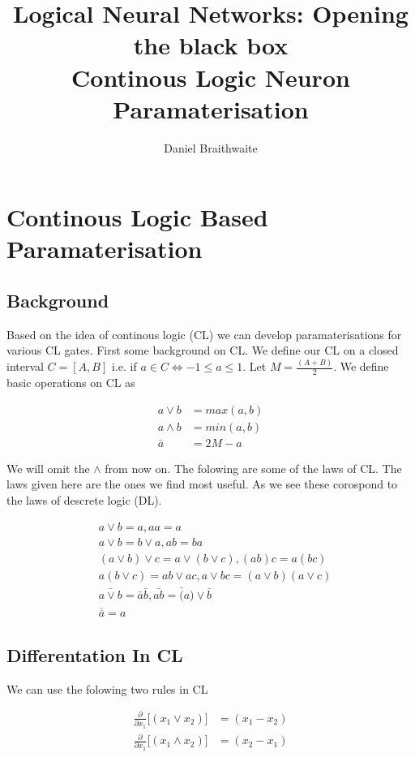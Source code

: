 \documentclass{article}
\title{%
	Logical Neural Networks: Opening the black box\\
	\large Continous Logic Neuron Paramaterisation
}
\author{Daniel Braithwaite}
\begin{document}
\maketitle

\section{Continous Logic Based Paramaterisation}
\subsection{Background}
Based on the idea of continous logic (CL) \cite{basicConceptsCL} we can develop paramaterisations for various CL gates. First some background on CL. We define our CL on a closed interval $C = [A, B]$ i.e. if $a \in C \iff -1 \leq a \leq 1$. Let  $M = \frac{(A + B)}{2}$. We define basic operations on CL as 

\begin{align}
a \lor b &= max(a, b) \\
a \land b &= min(a, b) \\
\bar{a} &= 2M - a
\end{align}

We will omit the $\land$ from now on. The folowing are some of the laws of CL. The laws given here are the ones we find most useful. As we see these corospond to the laws of descrete logic (DL).

\begin{align}
& a \lor b = a, aa = a \\
& a \lor b = b \lor a, ab = ba \\
& (a \lor b) \lor c = a \lor (b \lor c), (ab)c = a(bc) \\
& a(b \lor c) = ab \lor ac, a \lor bc = (a \lor b)(a \lor c) \\
& \bar{a \lor b} = \bar{a}\bar{b}, \bar{ab} = \bar(a) \lor \bar{b} \\
& \overline{\overline{a}} = a
\end{align}

\subsection{Differentation In CL}
We can use the folowing two rules in CL

\begin{align}
\frac{\partial}{\partial x_1} \bigg[ (x_1 \lor x_2) \bigg] &= (x_1 - x_2)\\
\frac{\partial}{\partial x_1} \bigg[ (x_1 \land x_2) \bigg] &= (x_2 - x_1)
\end{align}
\end{document}
